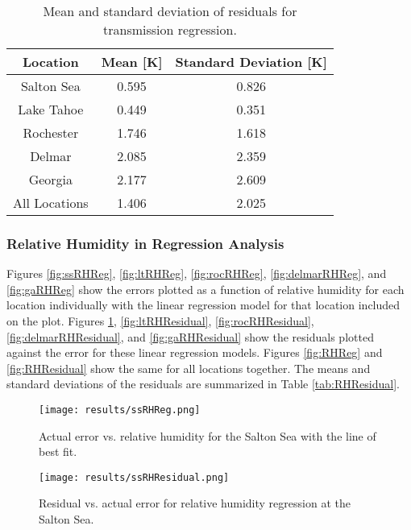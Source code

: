 \documentclass{book}
\begin{document}
\begin{table}[H]
\begin{center}
\begin{tabular}{| c | c | c |}
\hline
Location & Mean [K] & Standard Deviation [K] \\ \hline
Salton Sea & 0.595 & 0.826 \\ \hline
Lake Tahoe & 0.449 & 0.351 \\ \hline
Rochester & 1.746 & 1.618 \\ \hline
Delmar & 2.085 & 2.359 \\ \hline
Georgia & 2.177 & 2.609 \\ \hline
All Locations & 1.406 & 2.025 \\ \hline
\end{tabular}
\caption{Mean and standard deviation of residuals for transmission regression.}
\label{tab:TauResidual}
\end{center}
\end{table}

\subsubsection{Relative Humidity in Regression Analysis}

Figures \ref{fig:ssRHReg}, \ref{fig:ltRHReg}, \ref{fig:rocRHReg}, \ref{fig:delmarRHReg}, and \ref{fig:gaRHReg} show the errors plotted as a function of relative humidity for each location individually with the linear regression model for that location included on the plot.  Figures \ref{fig:ssRHResidual}, \ref{fig:ltRHResidual}, \ref{fig:rocRHResidual}, \ref{fig:delmarRHResidual}, and \ref{fig:gaRHResidual} show the residuals plotted against the error for these linear regression models.  Figures \ref{fig:RHReg} and \ref{fig:RHResidual} show the same for all locations together.  The means and standard deviations of the residuals are summarized in Table \ref{tab:RHResidual}.  

\begin{figure}[H]
\begin{minipage}[b]{0.47\textwidth}
\centering
\texttt{[image: results/ssRHReg.png]}
\caption{Actual error vs. relative humidity for the Salton Sea with the line of best fit.}
\label{fig:ssRHReg}
\end{minipage}
\begin{minipage}[b]{0.47\textwidth}
\centering
\texttt{[image: results/ssRHResidual.png]}
\caption{Residual vs. actual error for relative humidity regression at the Salton Sea.}
\label{fig:ssRHResidual}
\end{minipage}
\end{figure}
\end{document}

